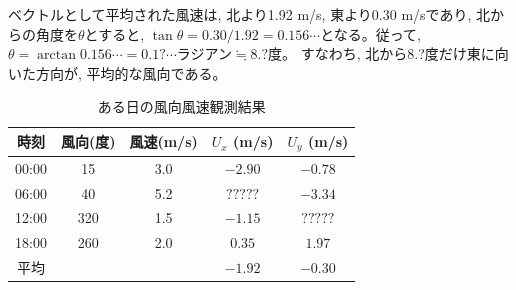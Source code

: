 ベクトルとして平均された風速は, 北より1.92 m/s, 東より0.30 m/sであり, 
北からの角度を$\theta$とすると, 
$\tan \theta=0.30/1.92=0.156\cdots$となる。従って, $\theta=\arctan 0.156\cdots=0.1?\cdots$ラジアン$\fallingdotseq 8.?$度。
すなわち, 北から8.?度だけ東に向いた方向が, 平均的な風向である。
\begin{table}[!htb]\caption{ある日の風向風速観測結果}
\begin{center}
\begin{tabular}{ccc|cc}\hline
時刻 & 風向(度) & 風速(m/s) & $U_x$ (m/s)& $U_y$ (m/s) \\\hline
00:00 & 15& 3.0 & $-2.90$ & $-0.78$\\
06:00 & 40& 5.2 & $?????$ & $-3.34$\\
12:00 & 320&1.5 & $-1.15$ & $?????$\\
18:00 & 260&2.0 & $0.35$ &$1.97$\\  \hline
平均 &    &     & $-1.92$ &$-0.30$\\  \hline
\end{tabular}
\end{center}
\end{table}

